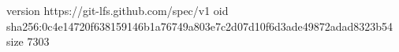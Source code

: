version https://git-lfs.github.com/spec/v1
oid sha256:0c4e14720f638159146b1a76749a803e7c2d07d10f6d3ade49872adad8323b54
size 7303
